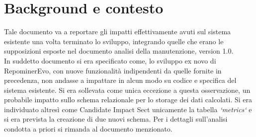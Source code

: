 \chapter{Background e contesto}
Tale documento va a reportare gli impatti effettivamente avuti sul sistema esistente una volta terminato lo sviluppo, integrando quelle che erano le supposizioni esposte nel documento analisi della manutenzione, version 1.0.\\

In suddetto documento si era specificato come, lo sviluppo ex novo di RepominerEvo, con nuove funzionalità indipendenti da quelle fornite in precedenza, non andasse a impattare in alcun modo su codice e specifica del sistema esistente.  Si era sollevata come unica eccezione a questa osservazione, un probabile impatto sullo schema relazionale per lo storage dei dati calcolati. Si era individuato altresì come Candidate Impact Sect unicamente la tabella \textit{`metrics`} e si era prevista la creazione di due nuovi schema. Per i dettagli sull'analisi condotta a priori si rimanda al documento menzionato.